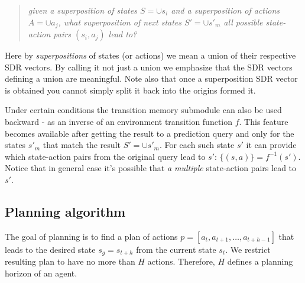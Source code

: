 \documentclass[a4paper,twoside]{article}
\begin{document}
\begin{quote}
  \textit{given a superposition of states $S = \cup s_i$ and a superposition of actions $A = \cup a_j$, what superposition of next states $S'= \cup s'_m$ all possible state-action pairs $(s_i, a_j)$ lead to?}
\end{quote}

Here by \textit{superpositions} of states (or actions) we mean a union of their respective SDR vectors. By calling it not just a union we emphasize that the SDR vectors defining a union are meaningful. Note also that once a superposition SDR vector is obtained you cannot simply split it back into the origins formed it\footnotemark.


Under certain conditions the transition memory submodule can also be used backward - as an inverse of an environment transition function $f$. This feature becomes available after getting the result to a prediction query and only for the states $s'_m$ that match the result $S' = \cup s'_m$. For each such state $s'$ it can provide which state-action pairs from the original query lead to $s'$: $\{(s, a)\} = f^{-1}(s')$. Notice that in general case it's possible that \textit{a multiple} state-action pairs lead to $s'$.

\subsection{Planning algorithm}

The goal of planning is to find a plan of actions $p = [a_t, a_{t+1}, \dots, a_{t+h-1}]$ that leads to the desired state $s_g = s_{t+h}$ from the current state $s_t$. We restrict resulting plan to have no more than $H$ actions. Therefore, $H$ defines a planning horizon of an agent.
\end{document}
